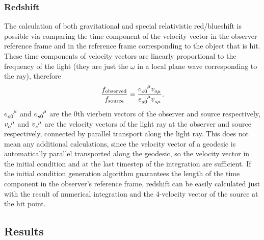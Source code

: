 \documentclass[pdftex,12pt,a4paper]{article}
\begin{document}
	\subsubsection{Redshift}
		The calculation of both gravitational and special relativistic red/blueshift is possible via comparing the time component of the velocity vector in the observer reference frame and in the reference frame corresponding to the object that is hit. These time components of velocity vectors are linearly proportional to the frequency of the light (they are just the $\omega$ in a local plane wave corresponding to the ray), therefore
		\begin{equation}
			\frac{f_{\text{observed}}}{f_{\text{source}}} = \frac{\tensor{e}{_o_0^\mu}\tensor{v}{_o_\mu}}{\tensor{e}{_s_0^\mu}\tensor{v}{_s_\mu}}.
		\end{equation}
		$\tensor{e}{_o_0^\mu}$ and $\tensor{e}{_s_0^\mu}$ are the 0th vierbein vectors of the observer and source respectively, $\tensor{v}{_o^\mu}$ and $\tensor{v}{_s^\mu}$ are the velocity vectors of the light ray at the observer and source respectively, connected by parallel transport along the light ray. This does not mean any additional calculations, since the velocity vector of a geodesic is automatically parallel transported along the geodesic, so the velocity vector in the initial condition and at the last timestep of the integration are sufficient. If the initial condition generation algorithm guarantees the length of the time component in the observer's reference frame, redshift can be easily calculated just with the result of numerical integration and the 4-velocity vector of the source at the hit point.
	\subsection{Results}
		
\end{document}
